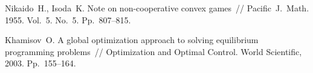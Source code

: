 \begin{thebibliography}{9} %
 Nikaido~H., Isoda~K. Note on non-cooperative convex games~// Pacific~J.~Math. 1955. Vol.~5. No.~5. Pp.~807--815.

 Khamisov~O. A global optimization approach to solving equilibrium programming problems~// Optimization and Optimal Control. World Scientific, 2003. Pp.~155--164.






\end{thebibliography}





%

